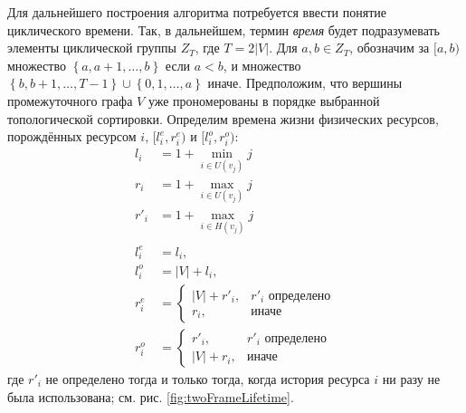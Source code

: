 Для дальнейшего построения алгоритма потребуется ввести понятие циклического времени.
Так, в дальнейшем, термин \textit{время} будет подразумевать элементы циклической группы $Z_T$, где $T = 2\left|V\right|$.
Для $a, b \in Z_T$, обозначим за $[a, b)$ множество $\left\{a, a+1, \dots, b\right\}$ если $a < b$, и множество $\left\{b, b + 1, \dots, T - 1\right\} \cup \left\{0,1, \dots, a\right\}$ иначе.
Предположим, что вершины промежуточного графа $V$ уже прономерованы в порядке выбранной топологической сортировки.
Определим времена жизни физических ресурсов, порождённых ресурсом $i$, $[l^e_i, r^e_i)$ и $[l^o_i, r^o_i)$:
\begin{align*}
l_i &= 1 + \min_{i \in U(v_j)} j\\
r_i &= 1 + \max_{i \in U(v_j)} j\\
r'_i &= 1 + \max_{i \in H(v_j)} j\\
\\
l^e_i &= l_i,\\
l^o_i &= \left|V\right| + l_i,\\
r^e_i &=
    \begin{cases}
        \left|V\right| + r'_i, & \text{$r'_i$ определено} \\
        r_i, & \text{иначе}
    \end{cases} \\
r^o_i &=
\begin{cases}
    r'_i, & \text{$r'_i$ определено} \\
    \left|V\right| + r_i, & \text{иначе}
\end{cases}
\end{align*}
где $r'_i$ не определено тогда и только тогда, когда история ресурса $i$ ни разу не была использована; см. рис. \ref{fig:twoFrameLifetime}.

